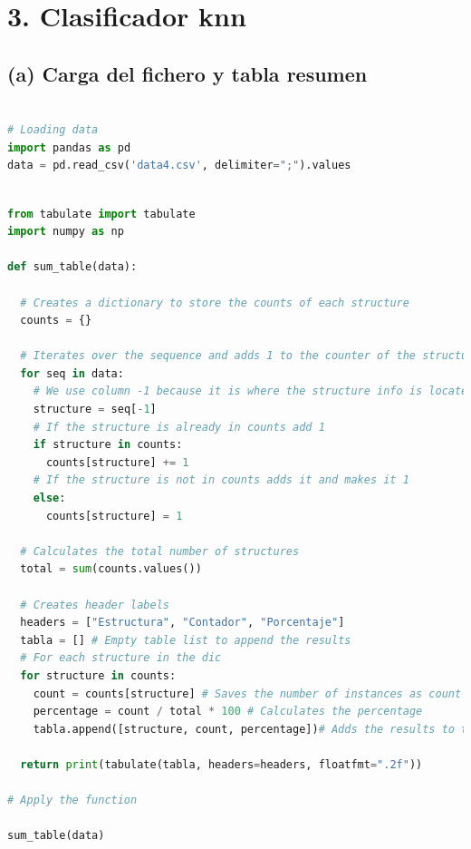 \documentclass[
]{article}
\begin{document}
\hypertarget{clasificador-knn}{%
\section{3. Clasificador knn}\label{clasificador-knn}}

\hypertarget{a-carga-del-fichero-y-tabla-resumen}{%
\subsection{(a) Carga del fichero y tabla
resumen}\label{a-carga-del-fichero-y-tabla-resumen}}

\begin{lstlisting}[language=Python]

# Loading data
import pandas as pd
data = pd.read_csv('data4.csv', delimiter=";").values
\end{lstlisting}

\begin{lstlisting}[language=Python]

from tabulate import tabulate
import numpy as np

def sum_table(data):
  
  # Creates a dictionary to store the counts of each structure
  counts = {}

  # Iterates over the sequence and adds 1 to the counter of the structure encountered
  for seq in data:
    # We use column -1 because it is where the structure info is located
    structure = seq[-1]
    # If the structure is already in counts add 1
    if structure in counts:
      counts[structure] += 1
    # If the structure is not in counts adds it and makes it 1
    else:
      counts[structure] = 1

  # Calculates the total number of structures
  total = sum(counts.values())

  # Creates header labels
  headers = ["Estructura", "Contador", "Porcentaje"]
  tabla = [] # Empty table list to append the results
  # For each structure in the dic
  for structure in counts:
    count = counts[structure] # Saves the number of instances as count
    percentage = count / total * 100 # Calculates the percentage
    tabla.append([structure, count, percentage])# Adds the results to the list
  
  return print(tabulate(tabla, headers=headers, floatfmt=".2f"))

# Apply the function

sum_table(data)
\end{lstlisting}
\end{document}

